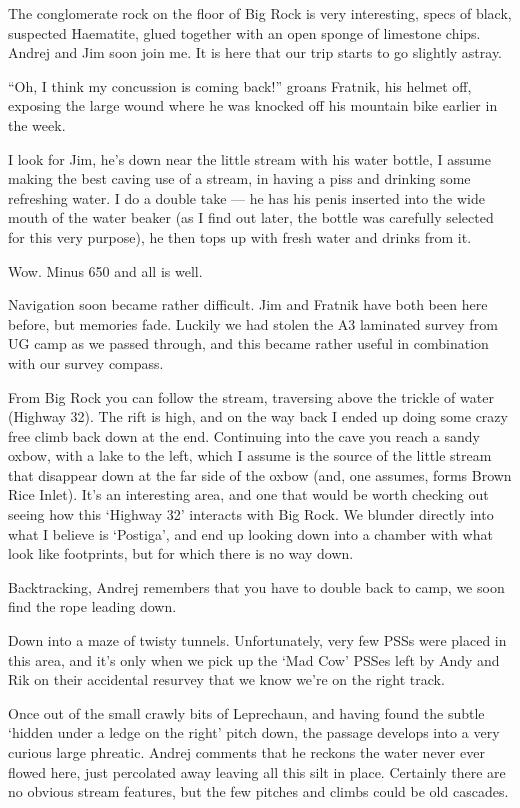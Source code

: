 The conglomerate rock on the floor of Big Rock is very interesting,
specs of black, suspected Haematite, glued together with an open sponge
of limestone chips. Andrej and Jim soon join me. It is here that our
trip starts to go slightly astray.

``Oh, I think my concussion is coming back!'' groans Fratnik, his helmet
off, exposing the large wound where he was knocked off his mountain bike
earlier in the week.

I look for Jim, he's down near the little stream with his water bottle,
I assume making the best caving use of a stream, in having a piss and
drinking some refreshing water. I do a double take --- he has his penis
inserted into the wide mouth of the water beaker (as I find out later,
the bottle was carefully selected for this very purpose), he then tops
up with fresh water and drinks from it.

Wow. Minus 650 and all is well.

Navigation soon became rather difficult. Jim and Fratnik have both been
here before, but memories fade. Luckily we had stolen the A3 laminated
survey from UG camp as we passed through, and this became rather useful
in combination with our survey compass.

From Big Rock you can follow the stream, traversing above the trickle of
water (Highway 32). The rift is high, and on the way back I ended up
doing some crazy free climb back down at the end. Continuing into the
cave you reach a sandy oxbow, with a lake to the left, which I assume is
the source of the little stream that disappear down at the far side of
the oxbow (and, one assumes, forms Brown Rice Inlet). It's an
interesting area, and one that would be worth checking out seeing how
this `Highway 32' interacts with Big Rock. We blunder directly into what
I believe is `Postiga', and end up looking down into a chamber with what
look like footprints, but for which there is no way down.

Backtracking, Andrej remembers that you have to double back to camp, we
soon find the rope leading down.

Down into a maze of twisty tunnels. Unfortunately, very few PSSs were
placed in this area, and it's only when we pick up the `Mad Cow' PSSes
left by Andy and Rik on their accidental resurvey that we know we're on
the right track.

Once out of the small crawly bits of Leprechaun, and having found the
subtle `hidden under a ledge on the right' pitch down, the passage
develops into a very curious large phreatic. Andrej comments that he
reckons the water never ever flowed here, just percolated away leaving
all this silt in place. Certainly there are no obvious stream features,
but the few pitches and climbs could be old cascades.

